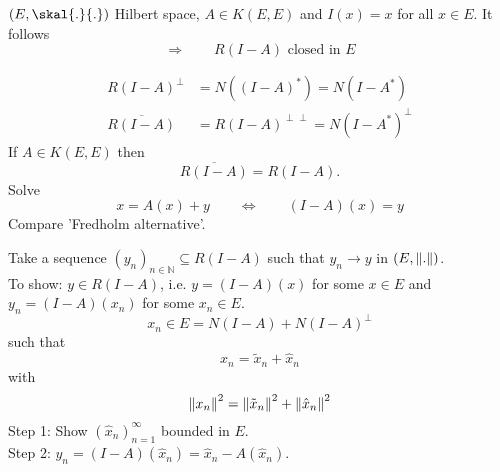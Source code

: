 \begin{beispiel}
	$(E,\skal{.}{.})$ Hilbert space, $A \in K(E,E)$ and $I(x)=x$ for all $x \in E$. It follows
	\[
		\Rightarrow  \qquad R(I-A) \text{ closed in $E$}
	\]
\begin{bemerkung}
	\begin{align*}
		R(I-A)^{\perp} &= N((I-A)^{*}) = N(I-A^{*}) \\
		\overline{R(I-A)} &= R(I-A)^{\perp \perp} = N(I-A^{*})^{\perp}
	\end{align*}
	If $A \in K(E,E)$ then
	\[
		\overline{R(I-A)} = R(I-A).
	\]
	Solve \[
		x = A(x) + y \qquad \Leftrightarrow \qquad (I-A)(x) = y
	\]
	Compare 'Fredholm alternative'.
\end{bemerkung}
\end{beispiel}
\begin{beweis}
	Take a sequence $(y_n)_{n \in \mathbb{N}} \subseteq R(I-A)$ such that $y_n \to y$ in $(E,\norm{.})$. \\
	To show: $y \in R(I-A)$, i.e. $y = (I-A)(x)$ for some $x \in E$ and $y_n = (I-A)(x_n)$ for some $x_n \in E$.
	\[
		x_n \in E = N(I-A) + N(I-A)^{\perp}
	\]
	such that
	\[
		x_n = \tilde x_n + \hat x_n 
	\]
	with
	\[
		\norm{x_n}^2 = \norm{\tilde x_n}^2 + \norm{\hat x_n}^2
	\]
	Step 1: Show $(\hat x_n)_{n=1}^{\infty}$ bounded in $E$. \\
	Step 2: $y_n = (I-A)( \hat x_n) = \hat x_n - A( \hat x_n)$. \\
\end{beweis}
\cleardoubleoddemptypage
{}
\setcounter{page}{1}

